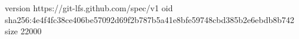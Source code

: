 version https://git-lfs.github.com/spec/v1
oid sha256:4e4f4fc38ce406be57092d69f2b787b5a41e8bfe59748cbd385b2e6ebdb8b742
size 22000
